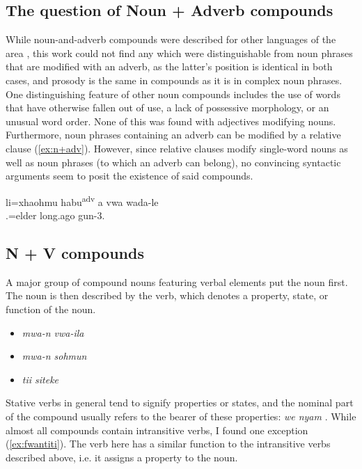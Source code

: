 \subsection{The question of Noun + Adverb compounds}
\label{sec:n+adv}
While noun-and-adverb compounds were described for other languages of the area \parencite[192, 200]{bril_noms_2004}, this work could not find any which were distinguishable from noun phrases that are modified with an adverb, as the latter's position is identical in both cases, and prosody is the same in compounds as it is in complex noun phrases. One distinguishing feature of other noun compounds includes the use of words that have otherwise fallen out of use, a lack of possessive morphology, or an unusual word order. None of this was found with adjectives modifying nouns. Furthermore, noun phrases containing an adverb can be modified by a relative clause (\ref{ex:n+adv}). However, since relative clauses modify single-word nouns as well as noun phrases (to which an adverb can belong), no convincing syntactic arguments seem to posit the existence of said compounds. 

\ea \label{ex:n+adv}
\gll li=xhaohmu habu\textsuperscript{adv} a vwa wada-le\\
 .=elder long.ago   gun-3.\\
\glt {}
\z



\subsection{N + V compounds}
A major group of compound nouns featuring verbal elements put the noun first. The noun is then described by the verb, which denotes a property, state, or function of the noun. 

\begin{itemize}
	\item \textit{mwa-n vwa-ila}  
	\item \textit{mwa-n sohmun}  
	\item \textit{tii siteke}  
\end{itemize}

Stative verbs in general tend to signify properties or states, and the nominal part of the compound usually refers to the bearer of these properties: \textit{we nyam}  .
While almost all compounds contain intransitive verbs, I found one exception (\ref{ex:fwantiti}). The verb here has a similar function to the intransitive verbs described above, i.e. it assigns a property to the noun.

